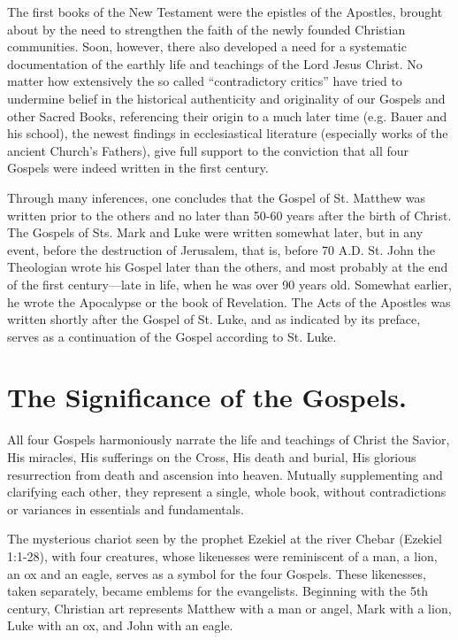 The first books of the New Testament were the epistles of the Apostles, brought about by the need to strengthen the faith of the newly founded Christian communities. Soon, however, there also developed a need for a systematic documentation of the earthly life and teachings of the Lord Jesus Christ. No matter how extensively the so called ``contradictory critics'' have tried to undermine belief in the historical authenticity and originality of our Gospels and other Sacred Books, referencing their origin to a much later time (e.g. Bauer and his school), the newest findings in ecclesiastical literature (especially works of the ancient Church's Fathers), give full support to the conviction that all four Gospels were indeed written in the first century.

Through many inferences, one concludes that the Gospel of St. Matthew was written prior to the others and no later than 50-60 years after the birth of Christ. The Gospels of Sts. Mark and Luke were written somewhat later, but in any event, before the destruction of Jerusalem, that is, before 70 A.D. St. John the Theologian wrote his Gospel later than the others, and most probably at the end of the first century---late in life, when he was over 90 years old. Somewhat earlier, he wrote the Apocalypse or the book of Revelation. The Acts of the Apostles was written shortly after the Gospel of St. Luke, and as indicated by its preface, serves as a continuation of the Gospel according to St. Luke.

\section{The Significance of the Gospels.}

All four Gospels harmoniously narrate the life and teachings of Christ the Savior, His miracles, His sufferings on the Cross, His death and burial, His glorious resurrection from death and ascension into heaven. Mutually supplementing and clarifying each other, they represent a single, whole book, without contradictions or variances in essentials and fundamentals.

The mysterious chariot seen by the prophet Ezekiel at the river Chebar (Ezekiel 1:1-28), with four creatures, whose likenesses were reminiscent of a man, a lion, an ox and an eagle, serves as a symbol for the four Gospels. These likenesses, taken separately, became emblems for the evangelists. Beginning with the 5th century, Christian art represents Matthew with a man or angel, Mark with a lion, Luke with an ox, and John with an eagle.

